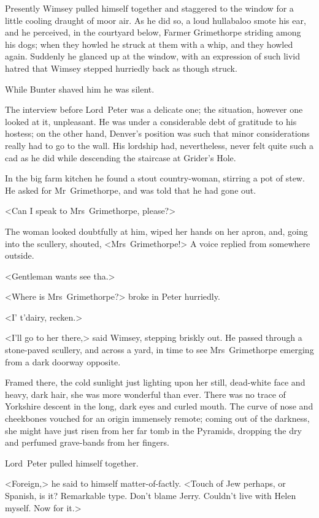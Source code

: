 Presently Wimsey pulled himself together and staggered to the window for a little cooling draught of moor air. As he did so, a loud hullabaloo smote his ear, and he perceived, in the courtyard below, Farmer Grimethorpe striding among his dogs; when they howled he struck at them with a whip, and they howled again. Suddenly he glanced up at the window, with an expression of such livid hatred that Wimsey stepped hurriedly back as though struck.

While Bunter shaved him he was silent. 

\divider

The interview before Lord~Peter was a delicate one; the situation, however one looked at it, unpleasant. He was under a considerable debt of gratitude to his hostess; on the other hand, Denver's position was such that minor considerations really had to go to the wall. His lordship had, nevertheless, never felt quite such a cad as he did while descending the staircase at Grider's Hole.

In the big farm kitchen he found a stout country-woman, stirring a pot of stew. He asked for Mr~Grimethorpe, and was told that he had gone out.

<Can I speak to Mrs~Grimethorpe, please?>

The woman looked doubtfully at him, wiped her hands on her apron, and, going into the scullery, shouted, <Mrs~Grimethorpe!> A voice replied from somewhere outside.

<Gentleman wants see tha.>

<Where is Mrs~Grimethorpe?> broke in Peter hurriedly.

<I' t'dairy, recken.>

<I'll go to her there,> said Wimsey, stepping briskly out. He passed through a stone-paved scullery, and across a yard, in time to see Mrs~Grimethorpe emerging from a dark doorway opposite.

Framed there, the cold sunlight just lighting upon her still, dead-white face and heavy, dark hair, she was more wonderful than ever.  There was no trace of Yorkshire descent in the long, dark eyes and curled mouth. The curve of nose and cheekbones vouched for an origin immensely remote; coming out of the darkness, she might have just risen from her far tomb in the Pyramids, dropping the dry and perfumed grave-bands from her fingers.

Lord~Peter pulled himself together.

<Foreign,> he said to himself matter-of-factly. <Touch of Jew perhaps, or Spanish, is it? Remarkable type. Don't blame Jerry. Couldn't live with Helen myself. Now for it.>

